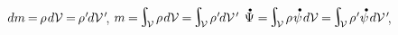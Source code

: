 \vspace{-0.5em} \noindent {}
${dm \hspace{-0.15ex} = \hspace{-0.2ex} \rho \hspace{.2ex} d\mathcal{V} \hspace{-0.1ex} = \hspace{-0.2ex} \rho\hspace{.1ex}' \hspace{-0.2ex} d\mathcal{V}\hspace{.2ex}'\hspace{-0.5ex}}$,
${m \hspace{-0.1ex} = \hspace{-0.25ex}\scalebox{1.4}{$\integral$}_{\hspace{-0.5ex}\raisemath{.05em}{\mathcal{V}}} \hspace{.3ex} \rho \hspace{.2ex} d\mathcal{V} \hspace{-0.1ex} = \hspace{-0.25ex}\scalebox{1.4}{$\integral$}_{\hspace{-0.5ex}\raisemath{.05em}{\mathcal{V}}} \hspace{.3ex} \rho\hspace{.1ex}' \hspace{-0.2ex} d\mathcal{V}\hspace{.2ex}'\hspace{-0.25ex}}$
${\mathdotabove{\Psi} = \hspace{-0.25ex}\scalebox{1.4}{$\integral$}_{\hspace{-0.5ex}\raisemath{.05em}{\mathcal{V}}} \hspace{.3ex} \rho \hspace{.2ex} \mathdotabove{\psi} \hspace{.2ex} d\mathcal{V} \hspace{-0.1ex} = \hspace{-0.25ex}\scalebox{1.4}{$\integral$}_{\hspace{-0.5ex}\raisemath{.05em}{\mathcal{V}}} \hspace{.3ex} \rho \hspace{.1ex}' \mathdotabove{\psi} \hspace{.2ex} d\mathcal{V}\hspace{.2ex}'\hspace{-0.5ex}}$,
 

